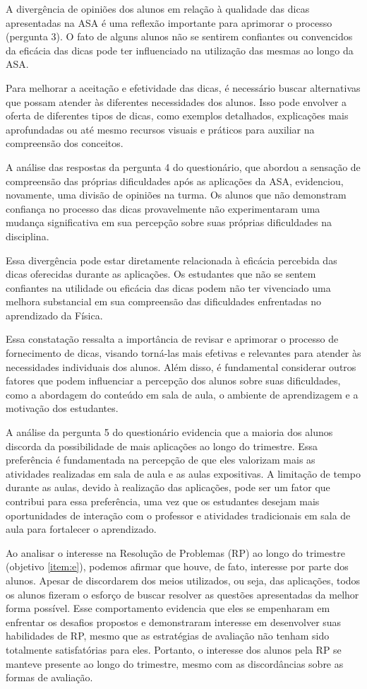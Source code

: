 A divergência de opiniões dos alunos em relação à qualidade das dicas apresentadas na ASA é uma reflexão importante para aprimorar o processo (pergunta 3). O fato de alguns alunos não se sentirem confiantes ou convencidos da eficácia das dicas pode ter influenciado na utilização das mesmas ao longo da ASA.

Para melhorar a aceitação e efetividade das dicas, é necessário buscar alternativas que possam atender às diferentes necessidades dos alunos. Isso pode envolver a oferta de diferentes tipos de dicas, como exemplos detalhados, explicações mais aprofundadas ou até mesmo recursos visuais e práticos para auxiliar na compreensão dos conceitos.

A análise das respostas da pergunta 4 do questionário, que abordou a sensação de compreensão das próprias dificuldades após as aplicações da ASA, evidenciou, novamente, uma divisão de opiniões na turma. Os alunos que não demonstram confiança no processo das dicas provavelmente não experimentaram uma mudança significativa em sua percepção sobre suas próprias dificuldades na disciplina.

Essa divergência pode estar diretamente relacionada à eficácia percebida das dicas oferecidas durante as aplicações. Os estudantes que não se sentem confiantes na utilidade ou eficácia das dicas podem não ter vivenciado uma melhora substancial em sua compreensão das dificuldades enfrentadas no aprendizado da Física.

Essa constatação ressalta a importância de revisar e aprimorar o processo de fornecimento de dicas, visando torná-las mais efetivas e relevantes para atender às necessidades individuais dos alunos. Além disso, é fundamental considerar outros fatores que podem influenciar a percepção dos alunos sobre suas dificuldades, como a abordagem do conteúdo em sala de aula, o ambiente de aprendizagem e a motivação dos estudantes.

A análise da pergunta 5 do questionário evidencia que a maioria dos alunos discorda da possibilidade de mais aplicações ao longo do trimestre. Essa preferência é fundamentada na percepção de que eles valorizam mais as atividades realizadas em sala de aula e as aulas expositivas. A limitação de tempo durante as aulas, devido à realização das aplicações, pode ser um fator que contribui para essa preferência, uma vez que os estudantes desejam mais oportunidades de interação com o professor e atividades tradicionais em sala de aula para fortalecer o aprendizado. 

Ao analisar o interesse na Resolução de Problemas (RP) ao longo do trimestre (objetivo \ref{item:e}), podemos afirmar que houve, de fato, interesse por parte dos alunos. Apesar de discordarem dos meios utilizados, ou seja, das aplicações, todos os alunos fizeram o esforço de buscar resolver as questões apresentadas da melhor forma possível. Esse comportamento evidencia que eles se empenharam em enfrentar os desafios propostos e demonstraram interesse em desenvolver suas habilidades de RP, mesmo que as estratégias de avaliação não tenham sido totalmente satisfatórias para eles. Portanto, o interesse dos alunos pela RP se manteve presente ao longo do trimestre, mesmo com as discordâncias sobre as formas de avaliação.


